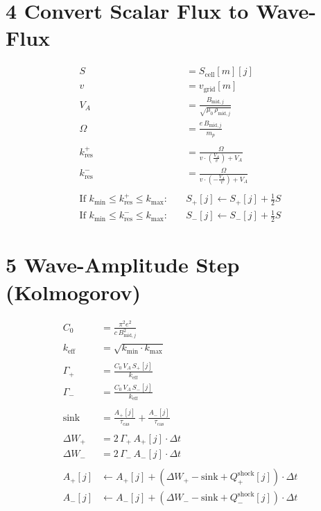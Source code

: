 \section*{4 Convert Scalar Flux to Wave-Flux}
\begin{align*}
S       &= S_{\text{cell}}[m][j] \\
v       &= v_{\text{grid}}[m] \\
V_A     &= \frac{B_{\text{mid},j}}{\sqrt{\mu_0 \, \rho_{\text{mid},j}}} \\
\Omega  &= \frac{e \, B_{\text{mid},j}}{m_p} \\
\\
k_{\text{res}}^{+}  &= \frac{\Omega}{v \cdot \left(\frac{V_A}{v}\right) + V_A} \\
k_{\text{res}}^{-} &= \frac{\Omega}{v \cdot \left(-\frac{V_A}{v}\right) + V_A} \\
\\
\text{If } k_{\min} \leq k_{\text{res}}^{+} \leq k_{\max}: \quad & S_{+}[j] \leftarrow S_{+}[j] + \tfrac{1}{2} S \\
\text{If } k_{\min} \leq k_{\text{res}}^{-} \leq k_{\max}: \quad & S_{-}[j] \leftarrow S_{-}[j] + \tfrac{1}{2} S
\end{align*}

\section*{5 Wave-Amplitude Step (Kolmogorov)}
\begin{align*}
C_0 &= \frac{\pi^2 e^2}{c \, B_{\text{mid},j}^2} \\
k_{\text{eff}} &= \sqrt{k_{\min} \cdot k_{\max}} \\
\\
\Gamma_{+}  &= \frac{C_0 \, V_A \, S_{+}[j]}{k_{\text{eff}}} \\
\Gamma_{-}  &= \frac{C_0 \, V_A \, S_{-}[j]}{k_{\text{eff}}} \\
\\
\text{sink} &= \frac{A_{+}[j]}{\tau_{\text{cas}}} + \frac{A_{-}[j]}{\tau_{\text{cas}}} \\
\\
\Delta W_{+}  &= 2 \, \Gamma_{+} \, A_{+}[j] \cdot \Delta t \\
\Delta W_{-}  &= 2 \, \Gamma_{-} \, A_{-}[j] \cdot \Delta t \\
\\
A_{+}[j]  &\leftarrow A_{+}[j] + \left(\Delta W_{+} - \text{sink} + Q^{\text{shock}}_{+}[j]\right) \cdot \Delta t \\
A_{-}[j]  &\leftarrow A_{-}[j] + \left(\Delta W_{-} - \text{sink} + Q^{\text{shock}}_{-}[j]\right) \cdot \Delta t
\end{align*}


